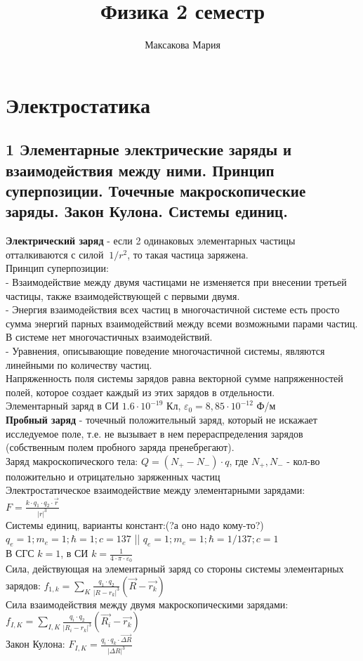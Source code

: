 \documentclass[a4paper,12pt]{article}
\author{Максакова Мария}
\title{Физика 2 семестр}
\begin{document}
\section{Электростатика}
\subsection{1   Элементарные электрические заряды и взаимодействия между ними. Принцип суперпозиции. Точечные макроскопические заряды. Закон Кулона. Системы единиц. }
\textbf{Электрический заряд} - если 2 одинаковых элементарных частицы отталкиваются с силой $~1/r^2$, то такая частица заряжена.\\
Принцип суперпозиции:\\
 - Взаимодействие между двумя частицами не изменяется при внесении третьей частицы, также взаимодействующей с первыми двумя.\\
 - Энергия взаимодействия всех частиц в многочастичной системе есть просто сумма энергий парных взаимодействий между всеми возможными парами частиц. В системе нет многочастичных взаимодействий.\\
 - Уравнения, описывающие поведение многочастичной системы, являются линейными по количеству частиц.\\
Напряженность поля системы зарядов равна векторной сумме напряженностей полей, которое создает каждый из этих зарядов в отдельности.\\
Элементарный заряд в СИ $1.6 \cdot 10^{-19}$ Кл, $\varepsilon _0 = 8,85 \cdot 10^{-12}$ Ф/м\\
\textbf{Пробный заряд} - точечный положительный заряд, который не искажает исследуемое поле, т.е. не вызывает в нем перераспределения зарядов (собственным полем пробного заряда пренебрегают).\\
Заряд макроскопического тела: $Q = (N_+ - N_-)\cdot q$, где $N_+, N_-$ - кол-во положительно и отрицательно заряженных частиц\\
Электростатическое взаимодействие между элементарными зарядами: $F = \frac{k \cdot q_1 \cdot q_2 \cdot \vec{r}}{|r|^3}$\\
Системы единиц, варианты констант:(?а оно надо кому-то?)\\
$q_e = 1; m_e = 1; \hbar = 1; c = 137$ || $q_e = 1; m_e = 1; \hbar = 1/137; c = 1$\\
В СГС $k = 1$, в СИ $k =  \frac{1}{4\cdot \pi \cdot \varepsilon _0}$\\
Сила, действующая на элементарный заряд со стороны системы элементарных зарядов: $f_{1,k} = \sum _K \frac{q_1 \cdot q_2}{|R - r_k|^3}(\vec{R} - \vec{r_k})$\\
Сила взаимодействия между двумя макроскопическими зарядами: $f_{I,K} = \sum _{I,K} \frac{q_i \cdot q_2}{|R_i - r_k|^3}(\vec{R_i} - \vec{r_k})$\\
Закон Кулона: $F_{I,K} = \frac{q_i \cdot q_k \cdot \vec{\Delta R}}{|\Delta R|^3}$\\
\end{document}

